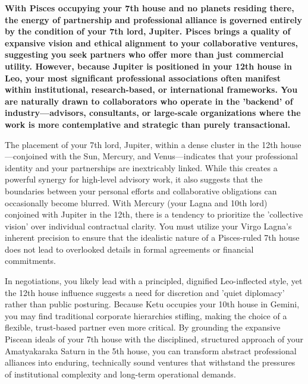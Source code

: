 
\label{topic18}

{\fontsize{9.5}{13.8}\selectfont\bfseries\color{DeepSlate} With Pisces occupying your 7th house and no planets residing there, the energy of partnership and professional alliance is governed entirely by the condition of your 7th lord, Jupiter. Pisces brings a quality of expansive vision and ethical alignment to your collaborative ventures, suggesting you seek partners who offer more than just commercial utility. However, because Jupiter is positioned in your 12th house in Leo, your most significant professional associations often manifest within institutional, research-based, or international frameworks. You are naturally drawn to collaborators who operate in the 'backend' of industry---advisors, consultants, or large-scale organizations where the work is more contemplative and strategic than purely transactional.}\par\vspace{2mm}

{\fontsize{9}{13}\selectfont The placement of your 7th lord, Jupiter, within a dense cluster in the 12th house---conjoined with the Sun, Mercury, and Venus---indicates that your professional identity and your partnerships are inextricably linked. While this creates a powerful synergy for high-level advisory work, it also suggests that the boundaries between your personal efforts and collaborative obligations can occasionally become blurred. With Mercury (your Lagna and 10th lord) conjoined with Jupiter in the 12th, there is a tendency to prioritize the 'collective vision' over individual contractual clarity. You must utilize your Virgo Lagna's inherent precision to ensure that the idealistic nature of a Pisces-ruled 7th house does not lead to overlooked details in formal agreements or financial commitments.}\par\vspace{1.8mm}

{\fontsize{9}{13}\selectfont In negotiations, you likely lead with a principled, dignified Leo-inflected style, yet the 12th house influence suggests a need for discretion and 'quiet diplomacy' rather than public posturing. Because Ketu occupies your 10th house in Gemini, you may find traditional corporate hierarchies stifling, making the choice of a flexible, trust-based partner even more critical. By grounding the expansive Piscean ideals of your 7th house with the disciplined, structured approach of your Amatyakaraka Saturn in the 5th house, you can transform abstract professional alliances into enduring, technically sound ventures that withstand the pressures of institutional complexity and long-term operational demands.}\par\vspace{1.8mm}

